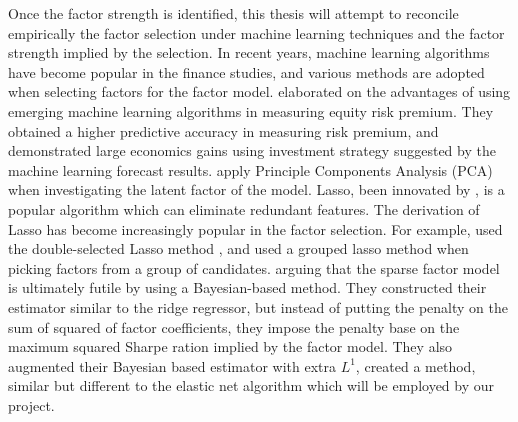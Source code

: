 Once the factor strength is identified, this thesis will attempt to reconcile empirically the factor selection under machine learning techniques and the factor strength implied by the selection.
In recent years, machine learning algorithms have become popular in the finance studies, and various methods are adopted when selecting factors for the factor model.
 elaborated on the advantages of using emerging machine learning algorithms in measuring equity risk premium.
They obtained a higher predictive accuracy in measuring risk premium, and demonstrated large economics gains using investment strategy suggested by the machine learning forecast results.
 apply Principle Components Analysis (PCA) when investigating the latent factor of the model. 
Lasso, been innovated by , is a popular algorithm which can eliminate redundant features. 
The derivation of Lasso has become increasingly popular in the factor selection.
For example,  used the double-selected Lasso method \cite{Belloni2014}, and  used a grouped lasso method \cite{Huang2010} when picking factors from a group of candidates. 
 arguing that the sparse factor model is ultimately futile by using a Bayesian-based method. 
They constructed their estimator similar to the ridge regressor, but instead of putting the penalty on the sum of squared of factor coefficients, they impose the penalty base on the maximum squared Sharpe ration implied by the factor model.
They also augmented their Bayesian based estimator with extra $L^1$, created a method,  similar but different to the elastic net algorithm which will be employed by our project. 
